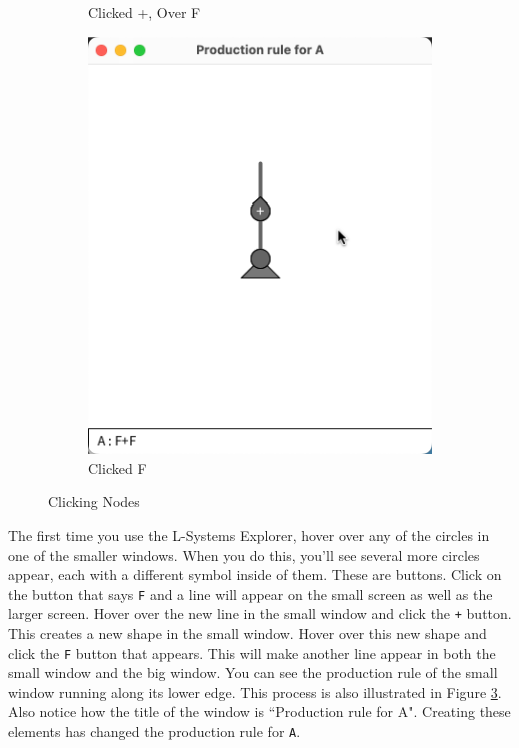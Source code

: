 \documentclass[12pt,twoside]{reedthesis}
\newcommand{\code}[1]{\texttt{#1}}
\begin{document}
\begin{figure}[H]
\begin{subfigure}{0.25\textwidth}
		\caption{Clicked +, Over F}
		\label {HowToExplore1C}
	\end{subfigure}%
	\begin{subfigure}{0.25\textwidth}
		\centering
		\includegraphics[trim={5cm 6cm 2cm 4cm}, clip, width=\textwidth]{Images/HowToExplore1D}
		\caption{Clicked F}
		\label {HowToExplore1D}
	\end{subfigure}
	\caption{Clicking Nodes}
	\label{ClickingNodes}
	\end{figure}
	
	The first time you use the L-Systems Explorer, hover over any of the circles in one of the smaller windows. When you do this, you'll see several more circles appear, each with a different symbol inside of them. These are buttons. Click on the button that says \code{F} and a line will appear on the small screen as well as the larger screen. Hover over the new line in the small window and click the \code{+} button. This creates a new shape in the small window. Hover over this new shape and click the \code{F} button that appears. This will make another line appear in both the small window and the big window. You can see the production rule of the small window running along its lower edge. This process is also illustrated in Figure \ref{ClickingNodes}. Also notice how the title of the window is ``Production rule for A". Creating these elements has changed the production rule for \code{A}.\\
	
\end{document}
